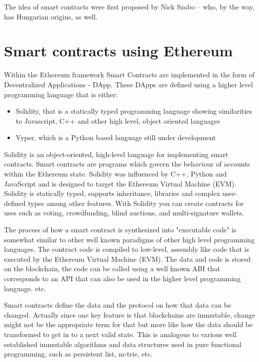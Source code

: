 \documentclass[a4paper]{article}
\begin{document}
The idea of smart contracts were first proposed by Nick Szabo -- who, by the way, has Hungarian origins, as well.


\section{Smart contracts using Ethereum}

Within the Ethereum framework Smart Contracts are implemented in the form of Decentralized Applications - DApp. These DApps are defined using a higher level programming language that is either:
\begin{itemize}
    \item Solidity, that is a statically typed programming language showing similarities to Javascript, C++ and other high level, object oriented languages \cite{solidity_manual}
    \item Vyper, which is a Python based language still under development \cite{vyper_doc}
\end{itemize}

Solidity is an object-oriented, high-level language for implementing smart contracts. Smart contracts are programs which govern the behaviour of accounts within the Ethereum state. Solidity was influenced by C++, Python and JavaScript and is designed to target the Ethereum Virtual Machine (EVM).
Solidity is statically typed, supports inheritance, libraries and complex user-defined types among other features. With Solidity you can create contracts for uses such as voting, crowdfunding, blind auctions, and multi-signature wallets.\cite{solidity_manual}

The process of how a smart contract is synthesized into "executable code" is somewhat similar to other well known paradigms of other high level programming languages. The contract code is compiled to low-level, assembly like code that is executed by the Ethereum Virtual Machine (EVM). The data and code is stored on the blockchain, the code can be called using a well known ABI that corresponds to an API that can also be used in the higher level programming language. etc.

Smart contracts define the data and the protocol on how that data can be changed. Actually since one key feature is that blockchains are immutable, change might not be the appropriate term for that but more like how the data should be transformed to get in to a next valid state. This is analogous to various well established immutable algorithms and data structures used in pure functional programming, such as persistent list, m-trie, etc. 
\end{document}
